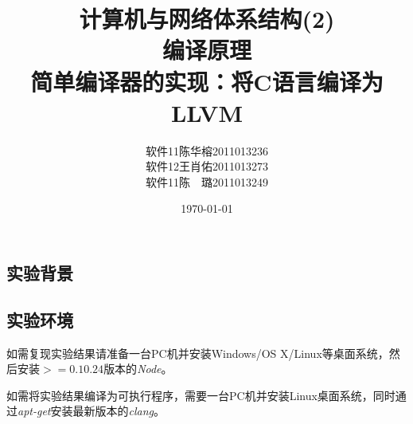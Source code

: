 \documentclass[a4paper]{article}
\begin{document}
\begin{CJK*}{UTF8}{gbsn}
    \CJKindent
    \setlength{\parindent}{2em} %

    \pagestyle{fancy}

    \title{\huge{计算机与网络体系结构(2)}\\\Large{编译原理}\\{\large 简单编译器的实现：将C语言编译为LLVM}}
    \author{
    软件11\hspace{10pt}陈华榕\hspace{10pt}2011013236\\
    软件12\hspace{10pt}王肖佑\hspace{10pt}2011013273\\
    软件11\hspace{10pt}陈　璐\hspace{10pt}2011013249
    }
    \date{\today}
    \maketitle
    \tableofcontents
    \newpage

    \section{实验背景}
    \subsection{实验环境}
    如需复现实验结果请准备一台PC机并安装Windows/OS X/Linux等桌面系统，然后安装$>=0.10.24$版本的\textit{Node}。
    \par 如需将实验结果编译为可执行程序，需要一台PC机并安装Linux桌面系统，同时通过\textit{apt-get}安装最新版本的\textit{clang}。


\end{CJK*}
\end{document}
